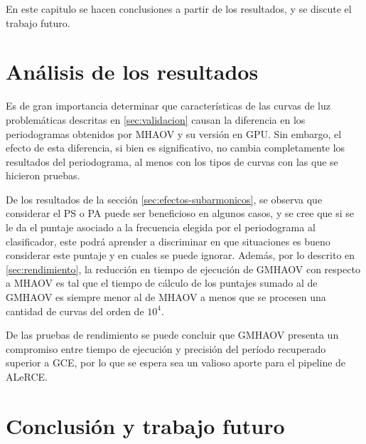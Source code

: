 En este capitulo se hacen conclusiones a partir de los resultados, y se discute el trabajo futuro.

\section{Análisis de los resultados}\label{sec:analisis}

Es de gran importancia determinar que características de las curvas de luz problemáticas descritas en \ref{sec:validacion} causan la diferencia en los periodogramas obtenidos por MHAOV y su versión en GPU. Sin embargo, el efecto de esta diferencia, si bien es significativo, no cambia completamente los resultados del periodograma, al menos con los tipos de curvas con las que se hicieron pruebas.

De los resultados de la sección \ref{sec:efectos-subarmonicos}, se observa que considerar el PS o PA puede ser beneficioso en algunos casos, y se cree que si se le da el puntaje asociado a la frecuencia elegida por el periodograma al clasificador, este podrá aprender a discriminar en que situaciones es bueno considerar este puntaje y en cuales se puede ignorar. %
Además, por lo descrito en \ref{sec:rendimiento}, la reducción en tiempo de ejecución de GMHAOV con respecto a MHAOV es tal que el tiempo de cálculo de los puntajes sumado al de GMHAOV es siempre menor al de MHAOV a menos que se procesen una cantidad de curvas del orden de $10^{4}$.


De las pruebas de rendimiento se puede concluir que GMHAOV presenta un compromiso entre tiempo de ejecución y precisión del período recuperado superior a GCE, por lo que se espera sea un valioso aporte para el pipeline de ALeRCE. 

\section{Conclusión y trabajo futuro}\label{sec:conclusion}

